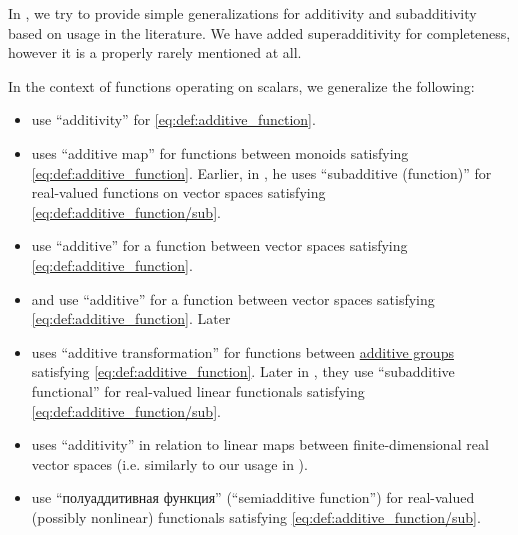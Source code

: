 \begin{remark}\label{rem:additive_function_terminology}
  In , we try to provide simple generalizations for additivity and subadditivity based on usage in the literature. We have added superadditivity for completeness, however it is a properly rarely mentioned at all.

  In the context of functions operating on scalars, we generalize the following:
  \begin{itemize}
    \item {} use \enquote{additivity} for \eqref{eq:def:additive_function}.

    \item {} uses \enquote{additive map} for functions between monoids satisfying \eqref{eq:def:additive_function}. Earlier, in \cite[\S 7.1]{Schechter1997AnalysisHandbook}, he uses \enquote{subadditive (function)} for real-valued functions on vector spaces satisfying \eqref{eq:def:additive_function/sub}.

    \item {} use \enquote{additive} for a function between vector spaces satisfying \eqref{eq:def:additive_function}.

    \item {} and  use \enquote{additive} for a function between vector spaces satisfying \eqref{eq:def:additive_function}. Later \cite[342]{ЛюстерникСоболев1965ФункциональныйАнализ}

    \item {} uses \enquote{additive transformation} for functions between \hyperref[con:additive_semigroup]{additive groups} satisfying \eqref{eq:def:additive_function}. Later in \cite[def. 2.5.1]{HillePhillips1996FunctionalAnalysis}, they use \enquote{subadditive functional} for real-valued linear functionals satisfying \eqref{eq:def:additive_function/sub}.

    \item {} uses \enquote{additivity} in relation to linear maps between finite-dimensional real vector spaces (i.e. similarly to our usage in ).

    \item {} use \enquote{полуаддитивная функция} (\enquote{semiadditive function}) for real-valued (possibly nonlinear) functionals satisfying \eqref{eq:def:additive_function/sub}.


\end{itemize}
\end{remark}
